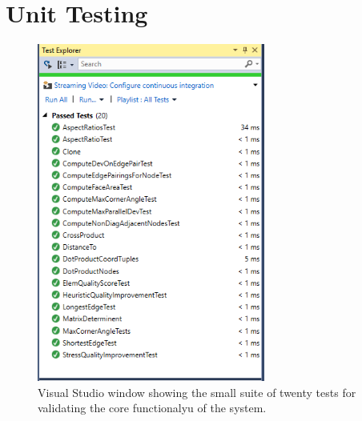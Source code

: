 





\section{Unit Testing}

\begin{figure}[H]
  \centerline{\includegraphics[width=75mm, scale=0.5]{../Graphics/unitTests.png}}
  \caption{Visual Studio window showing the small suite of twenty tests for validating the core functionalyu of the system.}
\end{figure}

